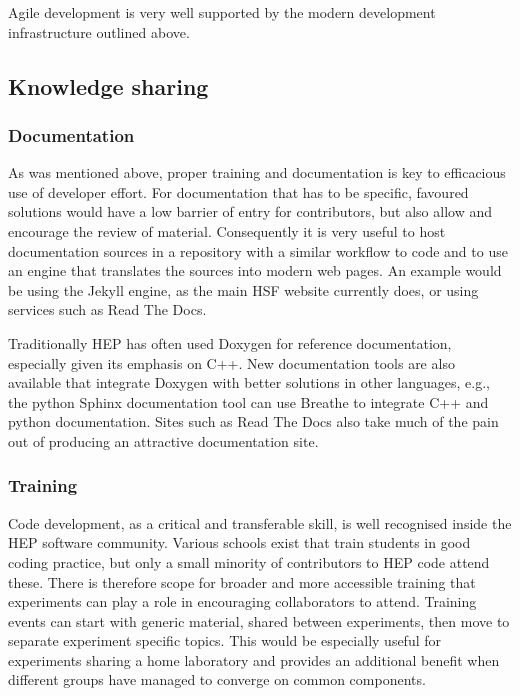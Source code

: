 \documentclass[12pt,a4paper]{article}
\begin{document}
Agile development is very well supported by the modern development
infrastructure outlined above.~

\hypertarget{knowledge-sharing}{%
\subsection{Knowledge sharing}\label{knowledge-sharing}}

\hypertarget{documentation}{%
\subsubsection{Documentation}\label{documentation}}

As was mentioned above, proper training and documentation is key to
efficacious use of developer effort. For documentation that has to be
specific, favoured solutions would have a low barrier of entry for
contributors, but also allow and encourage the review of material.
Consequently it is very useful to host documentation sources in a
repository with a similar workflow to code and to use an engine that
translates the sources into modern web pages. An example would be using
the Jekyll engine, as the main HSF website currently does, or using
services such as Read The Docs.

Traditionally HEP has often used Doxygen for reference
documentation, especially given its emphasis on C++. New documentation tools are also
available that integrate Doxygen with better solutions in other
languages, e.g., the python Sphinx documentation tool can use
Breathe to integrate C++ and python documentation. Sites such as
Read The Docs also take much of the pain out of producing an attractive documentation site.

\hypertarget{training}{%
\subsubsection{Training}\label{training}}

Code development, as a critical and transferable skill, is well
recognised inside the HEP software community. Various schools exist that
train students in good coding practice, but only a small minority of
contributors to HEP code attend these. There is therefore scope for
broader and more accessible training that experiments can play a role in
encouraging collaborators to attend. Training events can start with
generic material, shared between experiments, then move to separate
experiment specific topics. This would be especially useful for
experiments sharing a home laboratory and provides an additional benefit
when different groups have managed to converge on common components.
\end{document}
